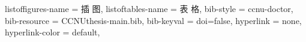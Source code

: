 {{      %
    listoffigures-name = {插 \quad 图},
    listoftables-name  = {表 \quad 格},
    bib-style = ccnu-doctor,
    bib-resource = {CCNUthesis-main.bib},
    bib-keyval = {doi=false},
    hyperlink = none,
    hyperlink-color = default,
  }
}






